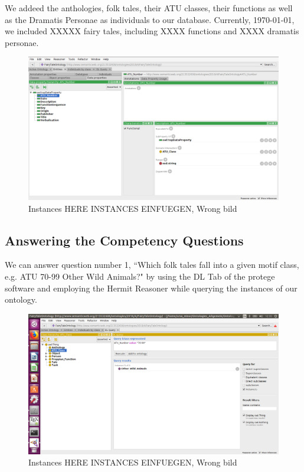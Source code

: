 \documentclass[10pt,a4paper]{article}
\begin{document}
We addeed the anthologies, folk tales, their ATU classes, their functions as well as the Dramatis Personae as individuals to our database. Currently, \today , we included XXXXX fairy tales, including XXXX functions and XXXX dramatis personae.
\begin{figure}[H]
\centering
 	\includegraphics[scale=0.25]{Screen5.png}
 	\caption{Instances HERE INSTANCES EINFUEGEN, Wrong bild}
\end{figure}
\newpage
\subsection{Answering the Competency Questions} 

We can answer question number 1, ``Which folk tales fall into a given motif class, e.g. ATU 70-99 Other Wild Animals?" by using the DL Tab of the protege software and employing the Hermit Reasoner while querying the instances of our ontology. 
\begin{figure}

\centering
 	\includegraphics[scale=0.2]{Screen6.png}
 	\caption{Instances HERE INSTANCES EINFUEGEN, Wrong bild}
\end{figure}
\end{document}
